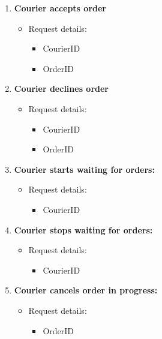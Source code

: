 \documentclass[a4paper,twoside,11pt]{article}
\begin{document}
\begin{enumerate}
    \item \textbf{Courier accepts order}
    \begin{itemize}
        \item Request details:
        \begin{itemize}
            \item CourierID
            \item OrderID
        \end{itemize}
    \end{itemize}

    \item \textbf{Courier declines order}
    \begin{itemize}
        \item Request details:
        \begin{itemize}
            \item CourierID
            \item OrderID
        \end{itemize}
    \end{itemize}

    \item \textbf{Courier starts waiting for orders:}
    \begin{itemize}
        \item Request details:
        \begin{itemize}
            \item CourierID
        \end{itemize}
    \end{itemize}

    \item \textbf{Courier stops waiting for orders:}
    \begin{itemize}
        \item Request details:
        \begin{itemize}
            \item CourierID
        \end{itemize}
    \end{itemize}

    \item \textbf{Courier cancels order in progress:}
    \begin{itemize}
        \item Request details:
        \begin{itemize}
            \item OrderID
        \end{itemize}
    \end{itemize}


\end{enumerate}
\end{document}
